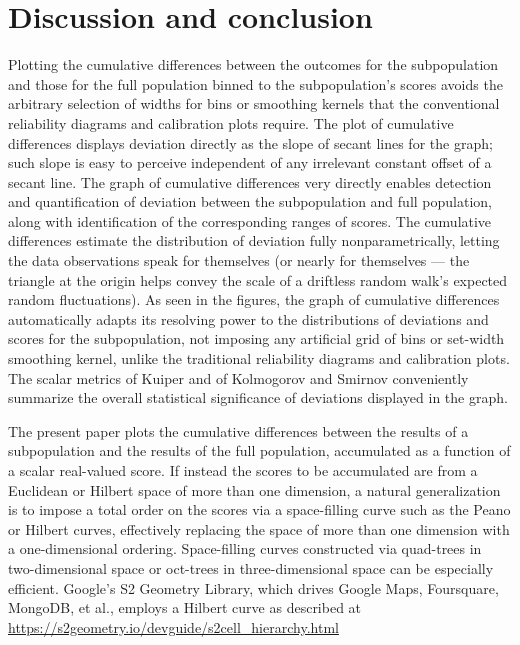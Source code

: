 \documentclass{article}
\begin{document}
\section{Discussion and conclusion}
\label{conclusion}

Plotting the cumulative differences between the outcomes for the subpopulation
and those for the full population binned to the subpopulation's scores
avoids the arbitrary selection of widths for bins or smoothing kernels
that the conventional reliability diagrams and calibration plots require.
The plot of cumulative differences displays deviation directly as the slope
of secant lines for the graph; such slope is easy to perceive independent
of any irrelevant constant offset of a secant line.
The graph of cumulative differences very directly enables detection
and quantification of deviation between the subpopulation and full population,
along with identification of the corresponding ranges of scores.
The cumulative differences estimate the distribution of deviation
fully nonparametrically, letting the data observations speak for themselves
(or nearly for themselves --- the triangle at the origin helps convey the scale
of a driftless random walk's expected random fluctuations).
As seen in the figures, the graph of cumulative differences automatically
adapts its resolving power to the distributions of deviations and scores
for the subpopulation, not imposing any artificial grid of bins
or set-width smoothing kernel, unlike the traditional reliability diagrams
and calibration plots.
The scalar metrics of Kuiper and of Kolmogorov and Smirnov
conveniently summarize the overall statistical significance of deviations
displayed in the graph.

The present paper plots the cumulative differences
between the results of a subpopulation and the results of the full population,
accumulated as a function of a scalar real-valued score.
If instead the scores to be accumulated are from a Euclidean or Hilbert space
of more than one dimension, a natural generalization is to impose
a total order on the scores via a space-filling curve
such as the Peano or Hilbert curves, effectively replacing
the space of more than one dimension with a one-dimensional ordering.
Space-filling curves constructed via quad-trees in two-dimensional space
or oct-trees in three-dimensional space can be especially efficient.
Google's S2 Geometry Library, which drives Google Maps, Foursquare, MongoDB,
et al., employs a Hilbert curve as described at
\url{https://s2geometry.io/devguide/s2cell_hierarchy.html}
\end{document}
